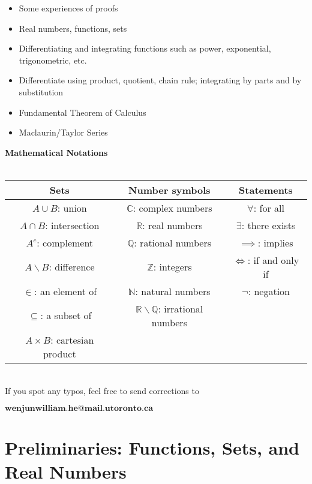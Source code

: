 \documentclass{book}
\begin{document}
\vspace{-2mm}
\begin{itemize}
        \item Some experiences of proofs
        \item Real numbers, functions, sets
        \item Differentiating and integrating functions such as power, exponential, trigonometric, etc.
        \item Differentiate using product, quotient, chain rule; integrating by parts and by substitution
        \item Fundamental Theorem of Calculus
        \item Maclaurin/Taylor Series
\end{itemize}
\begin{center}
    \textbf{\large Mathematical Notations} \ \\
    \ \\
    \begin{tabular}{c|c|c}
        Sets & Number symbols & Statements \\
        \hline
        $A \cup B$: union & $\mathbb{C}$: complex numbers & $\forall$: for all \\
        $A \cap B$: intersection & $\mathbb{R}$: real numbers & $\exists$: there exists \\
        $A^{c}$: complement & $\mathbb{Q}$: rational numbers & $\implies$: implies \\
        $A \backslash B$: difference & $\mathbb{Z}$: integers & $\iff$: if and only if \\
        $\in$: an element of & $\mathbb{N}$: natural numbers & $\neg$: negation \\
        $\subseteq$: a subset of & $\mathbb{R} \backslash \mathbb{Q}$: irrational numbers & \ \\
        $A \times B$: cartesian product & \ & \ \\
\end{tabular}
\end{center}
\ \\
\indent If you spot any typos, feel free to send corrections to

\begin{center}
    $\mathbf{wenjunwilliam.he@mail.utoronto.ca}$
\end{center}

\mainmatter

\chapter{Preliminaries: Functions, Sets, and Real Numbers}
\end{document}
